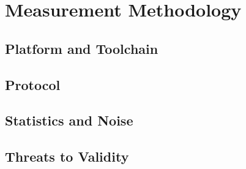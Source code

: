 \chapter{Measurement Methodology}
\label{ch:methodology}

\section{Platform and Toolchain}

\section{Protocol}

\section{Statistics and Noise}

\section{Threats to Validity}
